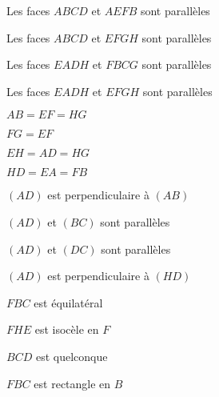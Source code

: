 \begin{QCM}
\begin{GroupeQCM}
    
     \begin{exercice}
      \begin{ChoixQCM}{4}
      \item Les faces $ABCD$ et $AEFB$ sont parallèles
      \item Les faces $ABCD$ et $EFGH$ sont parallèles
      \item Les faces $EADH$ et $FBCG$ sont parallèles
      \item Les faces $EADH$ et $EFGH$ sont parallèles
      \end{ChoixQCM}
\begin{corrige}
   \end{corrige}
    \end{exercice}
    
    
     \begin{exercice}
      \begin{ChoixQCM}{4}
      \item $AB = EF = HG$
      \item $FG = EF$
      \item $EH = AD = HG$
      \item $HD = EA = FB$
      \end{ChoixQCM}
\begin{corrige}
   \end{corrige}
    \end{exercice}
    
    
     \begin{exercice}
      \begin{ChoixQCM}{4}
      \item $(AD)$ est perpendiculaire à $(AB)$
      \item $(AD)$ et $(BC)$ sont parallèles
      \item $(AD)$ et $(DC)$ sont parallèles
      \item $(AD)$ est perpendiculaire à $(HD)$
      \end{ChoixQCM}
\begin{corrige}
   \end{corrige}
    \end{exercice}
    
    
     \begin{exercice}
      \begin{ChoixQCM}{4}
      \item $FBC$ est équilatéral
      \item $FHE$ est isocèle en $F$
      \item $BCD$ est quelconque
      \item $FBC$ est rectangle en $B$
      \end{ChoixQCM}
\begin{corrige}
   \end{corrige}
    \end{exercice}


\end{GroupeQCM}
\end{QCM}
